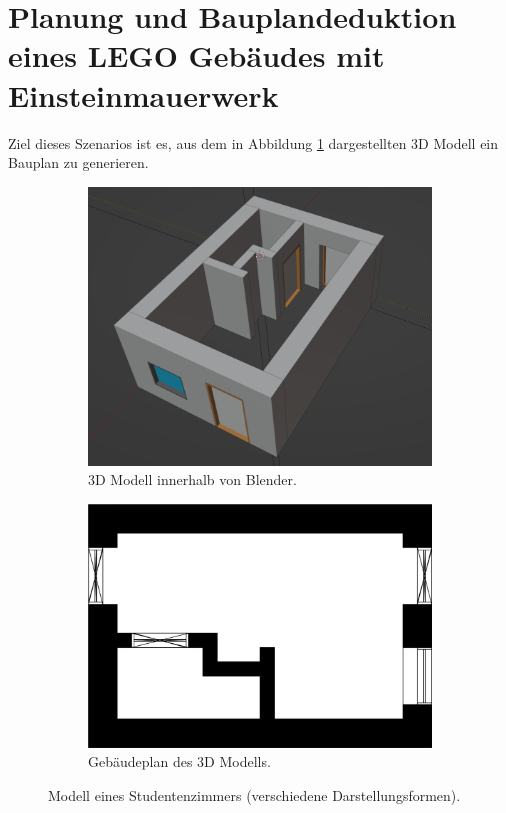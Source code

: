 \section{Planung und Bauplandeduktion eines LEGO Gebäudes mit Einsteinmauerwerk}
Ziel dieses Szenarios ist es, aus dem in Abbildung \ref{fig:Scenario1 Screenshot} dargestellten 3D Modell ein Bauplan zu generieren.
\begin{figure}[ht]
  \begin{subfigure}[b]{0.44\columnwidth}
    \includegraphics[width=\columnwidth]{fig/scenario1_screenshot.png}
    \caption{3D Modell innerhalb von Blender.}
    \label{fig:Scenario1 Screenshot}
  \end{subfigure}
  \hfill
  \begin{subfigure}[b]{0.505\columnwidth}
    \includegraphics[width=\columnwidth]{fig/scenario1_story_plan.jpg}
    \caption{Gebäudeplan des 3D Modells.}
    \label{fig:Scenario1 Gebäudeplan}
  \end{subfigure}
  \label{fig:Scenario1 komplett}
  \caption{Modell eines Studentenzimmers (verschiedene Darstellungsformen).}
\end{figure}
